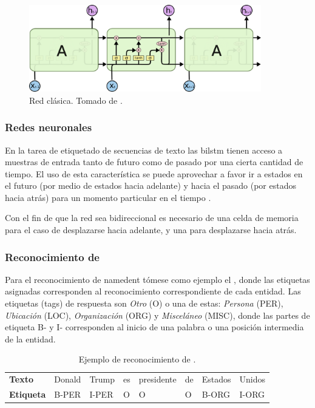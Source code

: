 \begin{figure}[H]
  \centering
  \includegraphics[width=0.9\textwidth]{Figures/LSTM3-chain.png}
\decoRule
\caption[Red  clásica]{Red  clásica. Tomado de \cite{understanding-lstm}.}
\label{fig:lstm-classic}
\end{figure}

\subsubsection{Redes neuronales }
En la tarea de etiquetado de secuencias de texto las \gls{bilstm} tienen acceso a muestras de entrada tanto de futuro como de pasado por una cierta cantidad de tiempo. El uso de esta característica se puede aprovechar a favor ir a estados en el futuro (por medio de estados hacia adelante) y hacia el pasado (por estados hacia atrás) para un momento particular en el tiempo \cite{Huang2015}.

Con el fin de que la red sea bidireccional es necesario de una celda de memoria para el caso de desplazarse hacia adelante, y una para desplazarse hacia atrás.

\subsubsection{Reconocimiento de }
Para el reconocimiento de \gls{namedent} tómese como ejemplo el , donde las etiquetas asignadas corresponden al reconocimiento correspondiente de cada entidad.
Las etiquetas (tags) de respuesta son \emph{Otro} (\textsc{O}) o una de estas: \emph{Persona} (\textsc{PER}), \emph{Ubicación} (\textsc{LOC}), \emph{Organización} (\textsc{ORG}) y \emph{Misceláneo} (\textsc{MISC}), donde las partes de etiqueta \textsc{B-} y \textsc{I-} corresponden al inicio de una palabra o una posición intermedia de la entidad.

\begin{table}[H]
  \centering
  \begin{tabular}{l|lllllll}
    \textbf{Texto}    & Donald   & Trump & es & presidente & de & Estados & Unidos \\
    \textbf{Etiqueta} & B-PER    & I-PER & O  & O          & O  & B-ORG   & I-ORG
  \end{tabular}
  \\ [1em]
  \decoRule
  \caption{Ejemplo de reconocimiento de .}
  \label{table:namedent-example}
\end{table}

